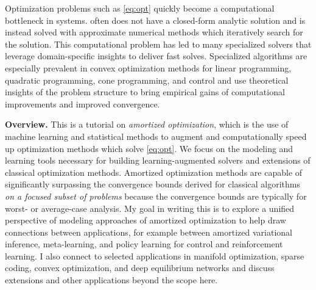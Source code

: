 \documentclass[twoside,11pt]{article}
\begin{document}
Optimization problems such as \cref{eq:opt} quickly become a
computational bottleneck in systems.
 often does not have a closed-form
analytic solution and is instead solved with
approximate numerical methods which iteratively
search for the solution.
This computational problem has led to many specialized
solvers that leverage domain-specific insights to
deliver fast solves. Specialized algorithms are
especially prevalent in convex optimization methods for
linear programming, quadratic programming, cone programming,
and control and use theoretical insights of the problem
structure to bring empirical gains of computational
improvements and improved convergence.

\textbf{Overview.} This is a tutorial on \emph{amortized optimization},
which is the use of machine learning and statistical
methods to augment and computationally speed up
optimization methods which solve \cref{eq:opt}.
We focus on the modeling and learning tools necessary for
building learning-augmented solvers and extensions of
classical optimization methods.
Amortized optimization methods are capable of
significantly surpassing the convergence bounds derived
for classical algorithms
\emph{on a focused subset of problems}
because the convergence bounds are typically for worst-
or average-case analysis.
My goal in writing this is to explore a unified perspective
of modeling approaches of amortized optimization to help draw
connections between applications, for example between
amortized variational inference, meta-learning,
and policy learning for control and reinforcement learning.
I also connect to selected applications
in manifold optimization, sparse coding, convex optimization,
and deep equilibrium networks and discuss extensions
and other applications beyond the scope here.
\end{document}
